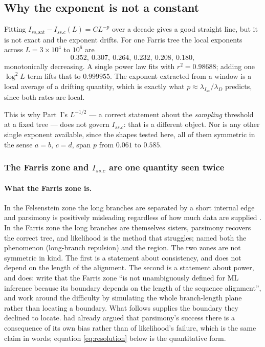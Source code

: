 \documentclass[preprint,12pt,authoryear]{elsarticle}
\newcommand{\Iss}{I_{ss}}
\newcommand{\Issc}{I_{ss.c}}
\newcommand{\Issat}{I_{ss,\mathrm{sat}}}
\newcommand{\lam}[1]{\lambda_{#1}}
\theoremstyle{definition}
\theoremstyle{remark}
\begin{document}
\subsection{Why the exponent is not a constant}
\label{sec:curvature}

Fitting $\Issat-\Issc(L)=C L^{-p}$ over a decade gives a good
straight line, but it is not exact and the exponent drifts. For one Farris
tree the local exponents across $L=3\times10^4$ to $10^6$ are
\begin{equation}
0.352,\ 0.307,\ 0.264,\ 0.232,\ 0.208,\ 0.180,
\end{equation}
monotonically decreasing. A single power law fits with $r^2=0.98688$; adding
one $\log^2 L$ term lifts that to $0.999955$. The exponent extracted from a
window is a local average of a drifting quantity, which is exactly what
$p\approx\lam{\Iss}/\lam D$ predicts, since both rates are local.

This is why Part~I's $L^{-1/2}$ --- a correct statement about
the \emph{sampling} threshold at a fixed tree --- does not govern $\Issc$:
that is a different object. Nor is any other single exponent available, since
the shapes tested here, all of them symmetric in the sense $a=b$, $c=d$,
span $p$ from $0.061$ to $0.585$.

\subsubsection{The Farris zone and $\Issc$ are one quantity seen twice}
\label{sec:shared}

\paragraph{What the Farris zone is.} In the Felsenstein zone the long
branches are separated by a short internal edge and parsimony is positively
misleading regardless of how much data are supplied
\citep{felsenstein1978,hendy1989}. In the Farris zone the long branches are
themselves sisters, parsimony recovers the correct tree, and likelihood is
the method that struggles; \citet{siddall1998} named both the phenomenon
(long-branch repulsion) and the region. The two zones are not symmetric in
kind. The first is a statement about consistency, and does not depend on the
length of the alignment. The second is a statement about power, and does:
\citet{leuchtenberger2020} write that the Farris zone ``is not unambiguously
defined for ML inference because its boundary depends on the length of the
sequence alignment'', and work around the difficulty by simulating the whole
branch-length plane rather than locating a boundary. What follows supplies
the boundary they declined to locate. \citet{swofford2001} had already argued
that parsimony's success there is a consequence of its own bias rather than of
likelihood's failure, which is the same claim in words; equation
\eqref{eq:resolution} below is the quantitative form.
\end{document}
